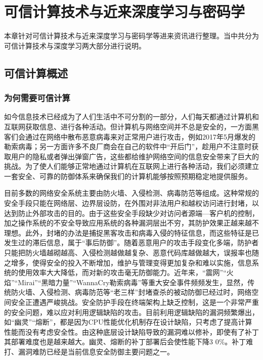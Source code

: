 \chapter{可信计算技术与近来深度学习与密码学}
\label{chap:3}

本章针对可信计算技术与近来深度学习与密码学等进来资讯进行整理。当中共分为可信计算技术与深度学习两大部分进行说明。

\section{可信计算概述}

\subsection{为何需要可信计算}

如今信息技术已经成为了人们生活中不可分割的一部分，人们每天都通过计算机和互联网获取信息、进行各种活动。但计算机与网络空间并不总是安全的，一方面黑客们会通过在网络中散布恶意病毒来对正常用户进行攻击，例如2017年5月爆发的勒索病毒；另一方面许多不良厂商会在自己的软件中“开后门”，趁用户不注意时获取用户的隐私或者弹出弹窗广告，这些都给维护网络空间的信息安全带来了巨大的挑战。为了使人们能够正常地通过计算机在互联网上进行各种活动，我们必须建立一套安全、可靠的防御体系来确保我们的计算机能够按照预期稳定地提供服务。

目前多数的网络安全系统主要由防火墙、入侵检测、病毒防范等组成。这种常规的安全手段只能在网络层、边界层设防，在外围对非法用户和越权访问进行封堵，以达到防止外部攻击的目的。由于这些安全手段缺少对访问者源端—客户机的控制，加之操作系统的不安全导致应用系统的各种漏洞层出不穷，其防护效果正越来越不理想。此外，封堵的办法是捕捉黑客攻击和病毒入侵的特征信息，而这些特征是已发生过的滞后信息，属于“事后防御”。随着恶意用户的攻击手段变化多端，防护者只能把防火墙越砌越高、入侵检测越做越复杂、恶意代码库越做越大，误报率也随之增多，使得安全的投入不断增加，维护与管理变得更加复杂和难以实施，信息系统的使用效率大大降低，而对新的攻击毫无防御能力。近年来，“震网”“火焰”“Mirai”“黑暗力量”“WannaCry勒索病毒”等重大安全事件频频发生，显然，传统防火墙、入侵检测、病毒防范等“老三样”封堵查杀的被动防御已经过时，网络空间安全正遭遇严峻挑战。安全防护手段在终端架构上缺乏控制，这是一个非常严重的安全问题，难以应对利用逻辑缺陷的攻击。目前利用逻辑缺陷的漏洞频繁爆出，如“幽灵”“熔断”，都是因为CPU性能优化机制存在设计缺陷，只考虑了提高计算性能而没有考虑安全性。由这种底层设计缺陷导致的漏洞难以修补，即使有了补丁其部署难度也是越来越大。幽灵、熔断的补丁部署后会使性能下降3 0\%。补丁难打、漏洞难防已经是当前信息安全防御主要问题之一。

